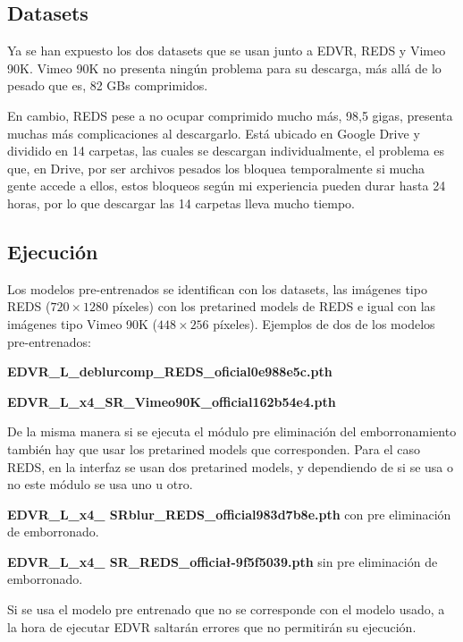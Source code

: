     \subsection {Datasets}
    Ya se han expuesto los dos datasets que se usan junto a EDVR, REDS y Vimeo 90K. Vimeo 90K no presenta ningún problema para su descarga, más allá de lo pesado que es, 82 GBs comprimidos.
    
    En cambio, REDS pese a no ocupar comprimido mucho más, 98,5 gigas, presenta muchas más complicaciones al descargarlo. Está ubicado en Google Drive y dividido en 14 carpetas, las cuales se descargan individualmente, el problema es que, en Drive, por ser archivos pesados los bloquea temporalmente si mucha gente accede a ellos, estos bloqueos según mi experiencia pueden durar hasta 24 horas, por lo que descargar las 14 carpetas lleva mucho tiempo.

    \subsection {Ejecución}
    Los modelos pre-entrenados se identifican con los datasets, las imágenes tipo REDS ($720\times 1280$ píxeles) con los pretarined models de REDS e igual con las imágenes tipo Vimeo 90K ($448\times 256$ píxeles). Ejemplos de dos de los modelos pre-entrenados:
    
    \textbf{EDVR\_L\_deblurcomp\_REDS\_oficial\-0e988e5c.pth}
    
    \textbf{EDVR\_L\_x4\_SR\_Vimeo90K\_official\-162b54e4.pth}
    
    De la misma manera si se ejecuta el módulo pre eliminación del emborronamiento  también hay que usar los pretarined models que corresponden. Para el caso REDS, en la interfaz se usan dos pretarined models, y dependiendo de si se usa o no este módulo  se usa uno u otro.
    
    \textbf{EDVR\_L\_x4\_{\color{red} SRblur}\_REDS\_official\-983d7b8e.pth} con pre eliminación de emborronado.
    
    \textbf{EDVR\_L\_x4\_{\color{red} SR}\_REDS\_officia\l-9f5f5039.pth} sin pre eliminación de emborronado.
    
    Si se usa el modelo pre entrenado que no se corresponde con el modelo usado, a la hora de ejecutar EDVR saltarán errores que no permitirán su ejecución.
    
